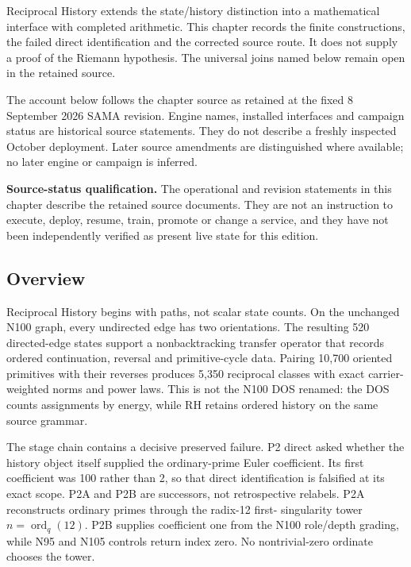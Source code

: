 \label{viii-ch09-reciprocal-history-and-the-completed-arithmetic-interface}

Reciprocal History extends the state/history distinction into a
mathematical interface with completed arithmetic. This chapter records
the finite constructions, the failed direct identification and the
corrected source route. It does not supply a proof of the Riemann
hypothesis. The universal joins named below remain open in the retained
source.

The account below follows the chapter source as retained at the fixed 8
September 2026 SAMA revision. Engine names, installed interfaces and
campaign status are historical source statements. They do not describe a
freshly inspected October deployment. Later source amendments are
distinguished where available; no later engine or campaign is inferred.

\textbf{Source-status qualification.} The operational and revision
statements in this chapter describe the retained source documents. They
are not an instruction to execute, deploy, resume, train, promote or
change a service, and they have not been independently verified as
present live state for this edition.

\subsection{Overview}\label{viii-ch09-overview}

Reciprocal History begins with paths, not scalar state counts. On the
unchanged N100 graph, every undirected edge has two orientations. The
resulting 520 directed-edge states support a nonbacktracking transfer
operator that records ordered continuation, reversal and primitive-cycle
data. Pairing 10,700 oriented primitives with their reverses produces
5,350 reciprocal classes with exact carrier-weighted norms and power
laws. This is not the N100 DOS renamed: the DOS counts assignments by
energy, while RH retains ordered history on the same source grammar.

The stage chain contains a decisive preserved failure. P2 direct asked
whether the history object itself supplied the ordinary-prime Euler
coefficient. Its first coefficient was 100 rather than 2, so that direct
identification is falsified at its exact scope. P2A and P2B are
successors, not retrospective relabels. P2A reconstructs ordinary primes
through the radix-12 first- singularity tower
\(n=\operatorname{ord}_q(12)\). P2B supplies coefficient one from the
N100 role/depth grading, while N95 and N105 controls return index zero.
No nontrivial-zero ordinate chooses the tower.

